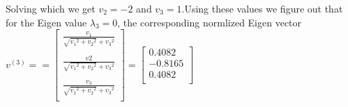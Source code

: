 \documentclass{article}
\begin{document}
Solving which we get $v_2 = -2$ and $v_3 = 1$.Using these values we figure out that for the Eigen value ${\lambda}_3 = 0$, the corresponding normlized Eigen vector $v^{(3)} = =  \begin{bmatrix}
\frac{v_1}{\sqrt{{v_1}^2 + {v_2}^2} + {v_3}^2} \\
\\
   \frac{v2}{\sqrt{{v_1}^2 + {v_2}^2} + {v_3}^2}\\
\\
    \frac{v_3}{\sqrt{{v_1}^2 + {v_2}^2} + {v_3}^2} \\
\end{bmatrix} = \begin{bmatrix}
0.4082 \\
  -0.8165\\
    0.4082 \\
\end{bmatrix}$\\
\end{document}
